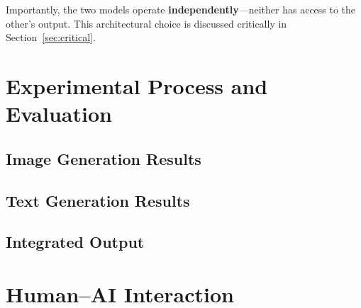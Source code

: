 \documentclass[12pt,a4paper]{article}
\begin{document}
Importantly, the two models operate \textbf{independently}---neither has access to the other's output. This architectural choice is discussed critically in Section~\ref{sec:critical}.

\section{Experimental Process and Evaluation}
\label{sec:evaluation}

\subsection{Image Generation Results}


\subsection{Text Generation Results}


\subsection{Integrated Output}


\section{Human--AI Interaction}
\label{sec:human_ai}
\end{document}
